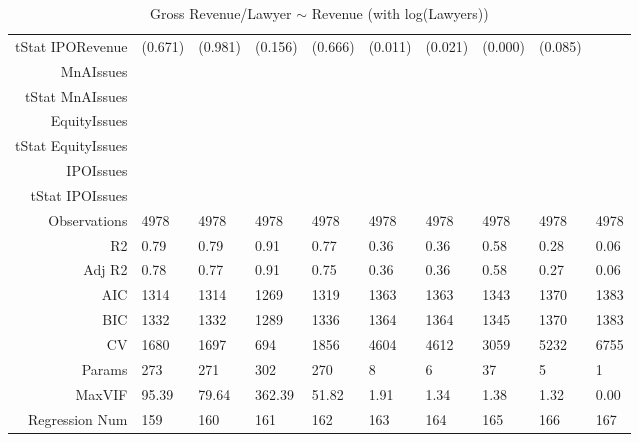 \begin{table}[ht]
\begin{tabular}{rlllllllll}
  tStat IPORevenue & (0.671) & (0.981) & (0.156) & (0.666) & (0.011) & (0.021) & (0.000) & (0.085) &  \\ 
  MnAIssues &  &  &  &  &  &  &  &  &  \\ 
  tStat MnAIssues &  &  &  &  &  &  &  &  &  \\ 
  EquityIssues &  &  &  &  &  &  &  &  &  \\ 
  tStat EquityIssues &  &  &  &  &  &  &  &  &  \\ 
  IPOIssues &  &  &  &  &  &  &  &  &  \\ 
  tStat IPOIssues &  &  &  &  &  &  &  &  &  \\ 
  Observations & 4978 & 4978 & 4978 & 4978 & 4978 & 4978 & 4978 & 4978 & 4978 \\ 
  R2 & 0.79 & 0.79 & 0.91 & 0.77 & 0.36 & 0.36 & 0.58 & 0.28 & 0.06 \\ 
  Adj R2 & 0.78 & 0.77 & 0.91 & 0.75 & 0.36 & 0.36 & 0.58 & 0.27 & 0.06 \\ 
  AIC & 1314 & 1314 & 1269 & 1319 & 1363 & 1363 & 1343 & 1370 & 1383 \\ 
  BIC & 1332 & 1332 & 1289 & 1336 & 1364 & 1364 & 1345 & 1370 & 1383 \\ 
  CV & 1680 & 1697 & 694 & 1856 & 4604 & 4612 & 3059 & 5232 & 6755 \\ 
  Params & 273 & 271 & 302 & 270 & 8 & 6 & 37 & 5 & 1 \\ 
  MaxVIF & 95.39 & 79.64 & 362.39 & 51.82 & 1.91 & 1.34 & 1.38 & 1.32 & 0.00 \\ 
  Regression Num & 159 & 160 & 161 & 162 & 163 & 164 & 165 & 166 & 167 \\ 
   \hline
\end{tabular}
\caption{Gross Revenue/Lawyer $\sim$ Revenue (with log(Lawyers))} 
\end{table}
